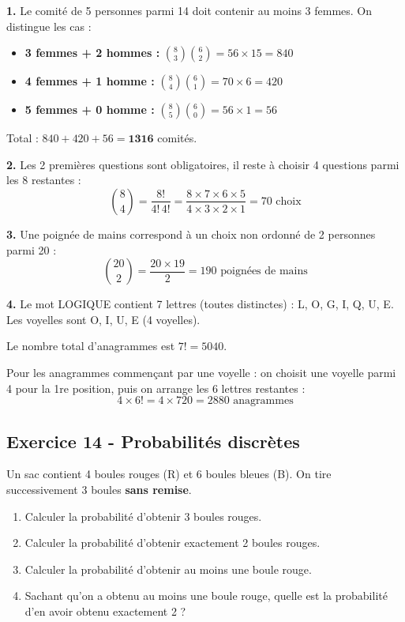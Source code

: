 \documentclass[12pt,a4paper]{article}
\begin{document}
\begin{boitecorrige}
\textbf{1.} Le comité de 5 personnes parmi 14 doit contenir au moins 3 femmes. On distingue les cas :
\begin{itemize}[nosep]
  \item \textbf{3 femmes + 2 hommes :} $\binom{8}{3}\binom{6}{2} = 56\times15 = 840$
  \item \textbf{4 femmes + 1 homme :} $\binom{8}{4}\binom{6}{1} = 70\times6 = 420$
  \item \textbf{5 femmes + 0 homme :} $\binom{8}{5}\binom{6}{0} = 56\times1 = 56$
\end{itemize}
Total : $840 + 420 + 56 = \mathbf{1316}$ comités.

\textbf{2.} Les 2 premières questions sont obligatoires, il reste à choisir 4 questions parmi les 8 restantes :
\[
\binom{8}{4} = \frac{8!}{4!\,4!} = \frac{8\times7\times6\times5}{4\times3\times2\times1} = 70 \text{ choix}
\]

\textbf{3.} Une poignée de mains correspond à un choix non ordonné de 2 personnes parmi 20 :
\[
\binom{20}{2} = \frac{20\times19}{2} = 190 \text{ poignées de mains}
\]

\textbf{4.} Le mot LOGIQUE contient 7 lettres (toutes distinctes) : L, O, G, I, Q, U, E. Les voyelles sont O, I, U, E (4 voyelles).

Le nombre total d'anagrammes est $7! = 5040$.

Pour les anagrammes commençant par une voyelle : on choisit une voyelle parmi 4 pour la 1re position, puis on arrange les 6 lettres restantes :
\[
4 \times 6! = 4 \times 720 = 2880 \text{ anagrammes}
\]
\end{boitecorrige}

\subsection*{Exercice 14 - Probabilités discrètes \niveau{\moyen}}

\begin{boiteexercice}
Un sac contient 4 boules rouges (R) et 6 boules bleues (B). On tire successivement 3 boules \textbf{sans remise}.
\begin{enumerate}
  \item Calculer la probabilité d'obtenir 3 boules rouges.
  \item Calculer la probabilité d'obtenir exactement 2 boules rouges.
  \item Calculer la probabilité d'obtenir au moins une boule rouge.
  \item Sachant qu'on a obtenu au moins une boule rouge, quelle est la probabilité d'en avoir obtenu exactement 2 ?
\end{enumerate}
\end{boiteexercice}
\end{document}

